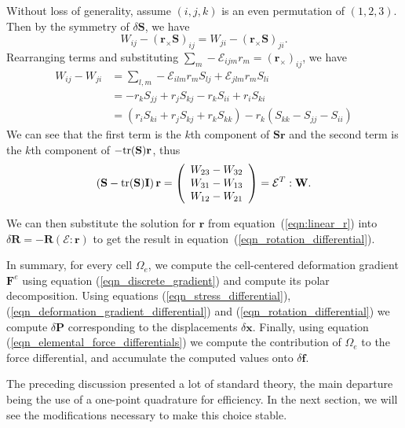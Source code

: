 Without loss of generality, assume $(i,j,k)$ is an even permutation of
$(1,2,3)$.  Then by the symmetry of $\delta\mathbf{S}$, we have
\begin{equation*}
W_{ij} - \left(\mathbf{r}_\times\mathbf{S}\right)_{ij} = W_{ji}
- \left(\mathbf{r}_\times\mathbf{S}\right)_{ji}.
\end{equation*}
Rearranging terms and substituting $\sum_m-\mathcal{E}_{ijm}r_m
= \left(\mathbf{r}_\times\right)_{ij}$, we have
\begin{align*}
W_{ij}-W_{ji} &= \sum_{l,m}-\mathcal{E}_{ilm}r_mS_{lj}
+ \mathcal{E}_{jlm}r_mS_{li}\\
  &= -r_kS_{jj} + r_jS_{kj} - r_kS_{ii} + r_iS_{ki}\\
  &= \left(r_iS_{ki} + r_jS_{kj} + r_kS_{kk}\right) - r_k\left(S_{kk}-S_{jj}-S_{ii}\right)
\end{align*}
We can see that the first term is the $k$th component of $\mathbf{Sr}$
and the second term is the $k$th component of
$-\mbox{tr}(\mathbf{S})\mathbf{r}$, thus
\begin{equation}
\left(\mathbf{S}-\mbox{tr}(\mathbf{S})\mathbf{I}\right)\mathbf{r}
= \left(\begin{array}{c} W_{23}-W_{32}\\
W_{31}-W_{13}\\
W_{12}-W_{21}\end{array}\right) = \mathcal{E}^T:\mathbf{W}.\label{eqn:linear_r}
\end{equation}

We can then substitute the solution for $\mathbf{r}$ from
equation~(\ref{eqn:linear_r}) into $\delta\mathbf{R} =
-\mathbf{R}\left(\mathcal{E}:\mathbf{r}\right)$ to get the result in equation~(\ref{eqn_rotation_differential}).



In summary, for every cell $\Omega_e$, we compute the cell-centered deformation gradient $\mathbf{F}^e$ using
equation (\ref{eqn_discrete_gradient}) and compute its polar decomposition. Using equations (\ref{eqn_stress_differential}), (\ref{eqn_deformation_gradient_differential}) and
(\ref{eqn_rotation_differential}) we compute $\delta\mathbf{P}$ corresponding to the displacements $\delta\mathbf{x}$. Finally, using equation
(\ref{eqn_elemental_force_differentials}) we compute the contribution of $\Omega_e$ to the force differential, and accumulate the computed values onto $\delta\mathbf{f}$.

The preceding discussion presented a lot of standard theory, the main departure
being the use of a one-point quadrature for efficiency. In the next section, we
will see the modifications necessary to make this choice stable.
